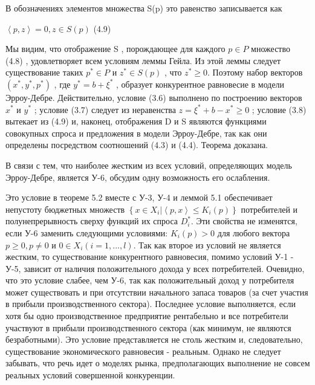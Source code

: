 \documentclass[12pt, 4paper]{book}
\begin{document}
{В обозначениях элементов множества S(p) это равенство записывается как
\begin{center}
$\left\langle p,z \right\rangle = 0, z \in S(p)$ (4.9)
\end{center}
\par

Мы видим, что отображение S , порождающее для каждого $p \in P$ множество (4.8) , удовлетворяет всем условиям леммы Гейла. Из этой леммы следует существование таких $p^{*} \in P$ и $z^{*} \in S(p)$ , что $z^{*} \geq 0$. Поэтому набор векторов $(x^{*},y^{*},p^{*})$ , где $y^{*} = b+ \xi^{*}$ , образует конкурентное равновесие в модели Эрроу-Дебре. Действительно, условие (3.6) выполнено по построению векторов $x^{*}$ и $y^{*}$ ; условие (3.7) следует из неравенства $z = \xi^{*} + b -x^{*} \geq 0$ ; условие (3.8) вытекает из (4.9) и, наконец, отображения D и S являются функциями совокупных спроса и предложения в модели Эрроу-Дебре, так как они определены посредством соотношений (4.3) и (4.4). Теорема доказана.
\par

В связи с тем, что наиболее жестким из всех условий, определяющих модель Эрроу-Дебре, является  У-6, обсудим одну возможность его ослабления.
\par

Это условие в теореме 5.2 вместе с У-3, У-4 и леммой 5.1 обеспечивает непустоту бюджетных множеств $\left\{ x \in X_i |\left\langle p,x \right\rangle \leq K_i(p)\right\}$ потребителей и полунепрерывность сверху функций их спроса $D_{i}^{*}$. Эти свойства не изменятся, если У-6 заменить следующими условиями: $K_i(p) > 0$ для любого вектора $p \geq 0,p \neq 0$ и $0 \in X_i (i=1,...,l)$. Так как второе из условий не является жестким, то существование конкурентного равновесия, помимо условий У-1 - У-5, зависит от наличия положительного дохода у всех потребителей. Очевидно, что это условие слабее, чем У-6, так как положительный доход у потребителя может существовать и при отсутствии начального запаса товаров (за счет участия в прибыли производственного сектора). Последнее условие выполняется, если хотя бы одно производственное предприятие рентабельно и все потребители участвуют в прибыли производственного сектора (как минимум, не являются безработными). Это условие представляется не столь жестким и, следовательно, существование экономического равновесия - реальным. Однако не следует забывать, что речь идет о моделях рынка, предполагающих выполнение не совсем реальных условий совершенной конкуренции.
\newpage
\begin{center}

\end{center}}
\end{document}
